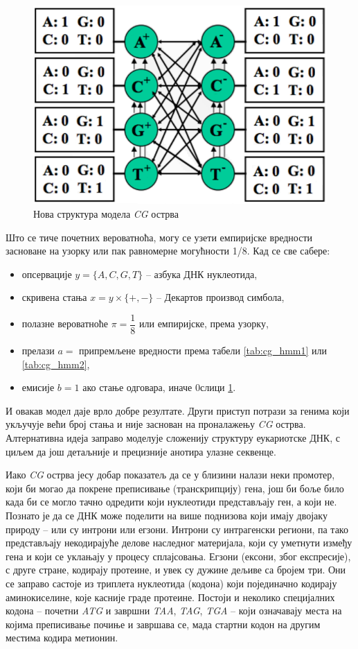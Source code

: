 \documentclass[12pt,oneside]{memoir}
\begin{document}
\begin{CJK}{UTF8}{ipxm}
\begin{figure}[H]
  \centering
  \includegraphics[width=.7\textwidth]{cg_stanja.png}
  \caption{Нова структура модела \textit{CG} острва\cite{kellis2021}}
  \label{fig:cg_stanja}
\end{figure}

Што се тиче почетних вероватноћа, могу се узети емпиријске вредности засноване на узорку или пак равномерне могућности 1/8. Кад се све сабере:
\begin{itemize}
  \item опсервације $y = \{A, C, G, T\}$ -- азбука ДНК нуклеотида,
  \item скривена стања $x = y \times \{+, -\}$ -- Декартов производ симбола,
  \item полазне вероватноће $\pi = \dfrac{1}{8}$ или емпиријске, према узорку,
  \item прелази $a =$ припремљене вредности према табели \ref{tab:cg_hmm1} или \ref{tab:cg_hmm2},
  \item емисије $b = 1$ ако стање одговара, иначе $0$слици \ref{fig:cg_stanja}.
\end{itemize}

И овакав модел даје врло добре резултате. Други приступ потрази за генима који укључује већи број стања и није заснован на проналажењу \textit{CG} острва. Алтернативна идеја заправо моделује сложенију структуру еукариотске ДНК, с циљем да још детаљније и прецизније анотира улазне секвенце.

Иако \textit{CG} острва јесу добар показатељ да се у близини налази неки промотер, који би могао да покрене преписивање (транскрипцију) гена, још би боље било када би се могло тачно одредити који нуклеотиди представљају ген, а који не. Познато је да се ДНК може поделити на више поднизова који имају двојаку природу -- или су интрони или егзони\cite{knapp2007, yoon2009}. Интрони су интрагенски региони, па тако представљају некодирајуће делове наследног материјала, који су уметнути између гена и који се уклањају у процесу сплајсовања. Егзони (ексони, због експресије), с друге стране, кодирају протеине, и увек су дужине дељиве са бројем три. Они се заправо састоје из триплета нуклеотида (кодона) који појединачно кодирају аминокиселине, које касније граде протеине. Постоји и неколико специјалних кодона -- почетни \textit{ATG} и завршни \textit{TAA}, \textit{TAG}, \textit{TGA} -- који означавају места на којима преписивање почиње и завршава се, мада стартни кодон на другим местима кодира метионин.


\end{CJK}
\end{document}
